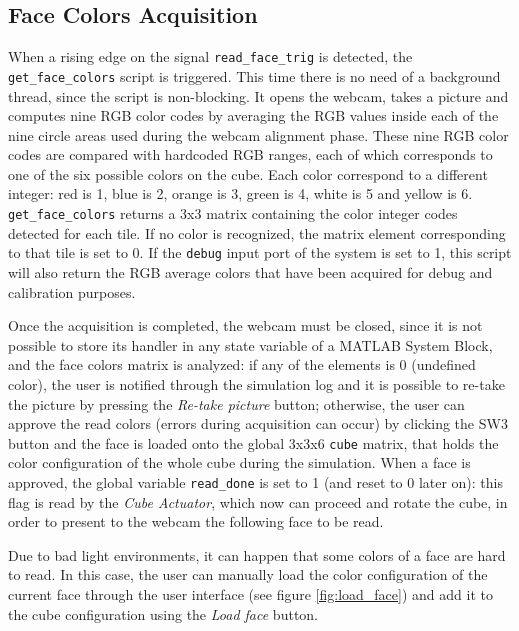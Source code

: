 \documentclass{report}
\begin{document}
\subsection{Face Colors Acquisition} \label{sub: fac-col-acq}
When a rising edge on the signal \texttt{read\_face\_trig} is detected, the \texttt{get\_face\_colors} script is triggered. This time there is no need of a background thread, since the script is non-blocking. It opens the webcam, takes a picture and computes nine RGB color codes by averaging the RGB values inside each of the nine circle areas used during the webcam alignment phase. These nine RGB color codes are compared with hardcoded RGB ranges, each of which corresponds to one of the six possible colors on the cube. Each color correspond to a different integer: red is 1, blue is 2, orange is 3, green is 4, white is 5 and yellow is 6. \texttt{get\_face\_colors} returns a 3x3 matrix containing the color integer codes detected for each tile. If no color is recognized, the matrix element corresponding to that tile is set to 0. If the \texttt{debug} input port of the system is set to 1, this script will also return the RGB average colors that have been acquired for debug and calibration purposes.

Once the acquisition is completed, the webcam must be closed, since it is not possible to store its handler in any state variable of a MATLAB System Block, and the face colors matrix is analyzed: if any of the elements is 0 (undefined color), the user is notified through the simulation log and it is possible to re-take the picture by pressing the \textit{Re-take picture} button; otherwise, the user can approve the read colors (errors during acquisition can occur) by clicking the SW3 button and the face is loaded onto the global 3x3x6 \texttt{cube} matrix, that holds the color configuration of the whole cube during the simulation. When a face is approved, the global variable \texttt{read\_done} is set to 1 (and reset to 0 later on): this flag is read by the \textit{Cube Actuator}, which now can proceed and rotate the cube, in order to present to the webcam the following face to be read.

\medskip

Due to bad light environments, it can happen that some colors of a face are hard to read. In this case, the user can manually load the color configuration of the current face through the user interface (see figure \ref{fig:load_face}) and add it to the cube configuration using the \textit{Load face} button.
\end{document}
